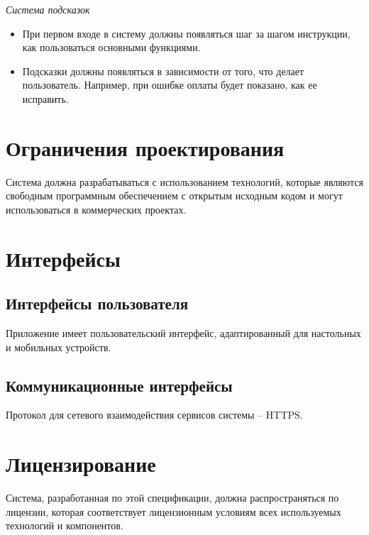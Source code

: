 \begin{center}
    \textit{Система подсказок}
\end{center}

\begin{itemize}
    \item При первом входе в систему должны
    появляться шаг за шагом инструкции, как пользоваться основными функциями.
    \item Подсказки должны появляться в
    зависимости от того, что делает пользователь. Например, при ошибке оплаты
    будет показано, как ее исправить.
\end{itemize}

\section{Ограничения проектирования}

Система должна разрабатываться с использованием технологий, которые являются
свободным программным обеспечением с открытым исходным кодом и могут
использоваться в коммерческих проектах.

\section{Интерфейсы}
\subsection{Интерфейсы пользователя}

Приложение имеет пользовательский интерфейс, адаптированный для
настольных и мобильных устройств.

\subsection{Коммуникационные интерфейсы}

Протокол для сетевого взаимодействия сервисов системы -- HTTPS.

\section{Лицензирование}

Система, разработанная по этой спецификации, должна распространяться по
лицензии, которая соответствует лицензионным условиям всех используемых
технологий и компонентов.
